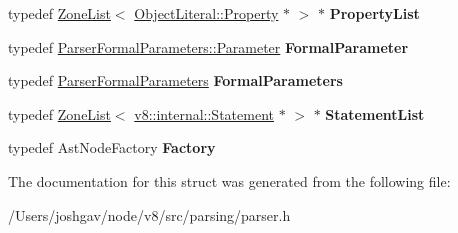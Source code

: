 \begin{DoxyCompactItemize}
\item 
typedef \hyperlink{classv8_1_1internal_1_1_zone_list}{Zone\+List}$<$ \hyperlink{classv8_1_1internal_1_1_object_literal_property}{Object\+Literal\+::\+Property} $\ast$ $>$ $\ast$ {\bfseries Property\+List}\hypertarget{structv8_1_1internal_1_1_parser_traits_1_1_type_ac7d855e7a3b0accd8de2e498b71f80fd}{}\label{structv8_1_1internal_1_1_parser_traits_1_1_type_ac7d855e7a3b0accd8de2e498b71f80fd}

\item 
typedef \hyperlink{structv8_1_1internal_1_1_parser_formal_parameters_1_1_parameter}{Parser\+Formal\+Parameters\+::\+Parameter} {\bfseries Formal\+Parameter}\hypertarget{structv8_1_1internal_1_1_parser_traits_1_1_type_abeafde1dc922e8ce9332eb55175ef7e9}{}\label{structv8_1_1internal_1_1_parser_traits_1_1_type_abeafde1dc922e8ce9332eb55175ef7e9}

\item 
typedef \hyperlink{structv8_1_1internal_1_1_parser_formal_parameters}{Parser\+Formal\+Parameters} {\bfseries Formal\+Parameters}\hypertarget{structv8_1_1internal_1_1_parser_traits_1_1_type_a88e126bce9f6e625d0a9b5b9fa0347e8}{}\label{structv8_1_1internal_1_1_parser_traits_1_1_type_a88e126bce9f6e625d0a9b5b9fa0347e8}

\item 
typedef \hyperlink{classv8_1_1internal_1_1_zone_list}{Zone\+List}$<$ \hyperlink{classv8_1_1internal_1_1_statement}{v8\+::internal\+::\+Statement} $\ast$ $>$ $\ast$ {\bfseries Statement\+List}\hypertarget{structv8_1_1internal_1_1_parser_traits_1_1_type_ae6ac4ee941ccf6d63eb66a8aee544f25}{}\label{structv8_1_1internal_1_1_parser_traits_1_1_type_ae6ac4ee941ccf6d63eb66a8aee544f25}

\item 
typedef Ast\+Node\+Factory {\bfseries Factory}\hypertarget{structv8_1_1internal_1_1_parser_traits_1_1_type_ac00e364df8f94ab2fb0e87c33f678051}{}\label{structv8_1_1internal_1_1_parser_traits_1_1_type_ac00e364df8f94ab2fb0e87c33f678051}

\end{DoxyCompactItemize}


The documentation for this struct was generated from the following file\+:\begin{DoxyCompactItemize}
\item 
/\+Users/joshgav/node/v8/src/parsing/parser.\+h\end{DoxyCompactItemize}
